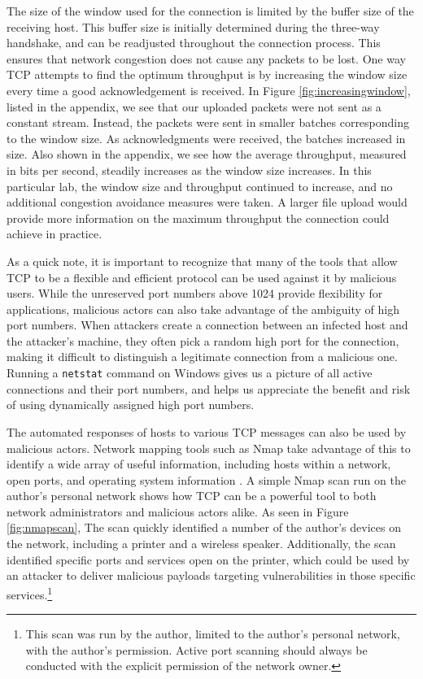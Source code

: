 \documentclass[10pt]{IEEEtran}
\begin{document}
 The size of the window used for the connection is limited by the buffer size of the receiving host. This buffer size is initially determined during the three-way handshake, and can be readjusted throughout the connection process. This ensures that network congestion does not cause any packets to be lost. One way TCP attempts to find the optimum throughput is by increasing the window size every time a good acknowledgement is received. In Figure \ref{fig:increasingwindow}, listed in the appendix, we see that our uploaded packets were not sent as a constant stream. Instead, the packets were sent in smaller batches corresponding to the window size. As acknowledgments were received, the batches increased in size.  Also shown in the appendix, we see how the average throughput, measured in bits per second, steadily increases as the window size increases. In this particular lab, the window size and throughput continued to increase, and no additional congestion avoidance measures were taken. A larger file upload would provide more information on the maximum throughput the connection could achieve in practice. 
   
 As a quick note, it is important to recognize that many of the tools that allow TCP to be a flexible and efficient protocol can be used against it by malicious users. While the unreserved port numbers above 1024 provide flexibility for applications, malicious actors can also take advantage of the ambiguity of high port numbers. When attackers create a connection between an infected host and the attacker's machine, they often pick a random high port for the connection, making it difficult to distinguish a legitimate connection from a malicious one. Running a {\tt netstat} command on Windows gives us a picture of all active connections and their port numbers, and helps us appreciate the benefit and risk of using dynamically assigned high port numbers.

 The automated responses of hosts to various TCP messages can also be used by malicious actors. Network mapping tools such as Nmap take advantage of this to identify a wide array of useful information, including hosts within a network, open ports, and operating system information \cite{nmap}. A simple Nmap scan run on the author's personal network shows how TCP can be a powerful tool to both network administrators and malicious actors alike. As seen in Figure \ref{fig:nmapscan}, The scan quickly identified a number of the author's devices on the network, including a printer and a wireless speaker. Additionally, the scan identified specific ports and services open on the printer, which could be used by an attacker to deliver malicious payloads targeting vulnerabilities in those specific services.\footnote{This scan was run by the author, limited to the author's personal network, with the author's permission. Active port scanning should always be conducted with the explicit permission of the network owner.}
 
\end{document}
